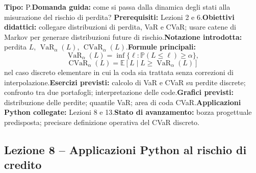 \documentclass[12pt,a4paper]{article}%
\begin{document}
\textbf{Tipo:} P.\newline\textbf{Domanda guida:} come si passa dalla dinamica
degli stati alla misurazione del rischio di perdita?\newline%
\textbf{Prerequisiti:} Lezioni 2 e 6.\newline\textbf{Obiettivi didattici:}
collegare distribuzioni di perdita, VaR e CVaR; usare catene di Markov per
generare distribuzioni future di rischio.\newline\textbf{Notazione
introdotta:} perdita $L$, $\operatorname{VaR}_{\alpha}(L)$,
$\operatorname{CVaR}_{\alpha}(L)$.\newline\textbf{Formule principali:}
\[
\operatorname{VaR}_{\alpha}(L)=\inf\{\ell:\mathbb{P}(L\leq\ell)\geq\alpha\},
\]
\[
\operatorname{CVaR}_{\alpha}(L)=\mathbb{E}[L\mid L\geq\operatorname{VaR}%
_{\alpha}(L)]
\]
nel caso discreto elementare in cui la coda sia trattata senza correzioni di
interpolazione.\newline\textbf{Esercizi previsti:} calcolo di VaR e CVaR su
perdite discrete; confronto tra due portafogli; interpretazione delle
code.\newline\textbf{Grafici previsti:} distribuzione delle perdite; quantile
VaR; area di coda CVaR.\newline\textbf{Applicazioni Python collegate:} Lezioni
8 e 13.\newline\textbf{Stato di avanzamento:} bozza progettuale predisposta;
precisare definizione operativa del CVaR discreto.

\subsection{Lezione 8 -- Applicazioni Python al rischio di credito}
\end{document}
